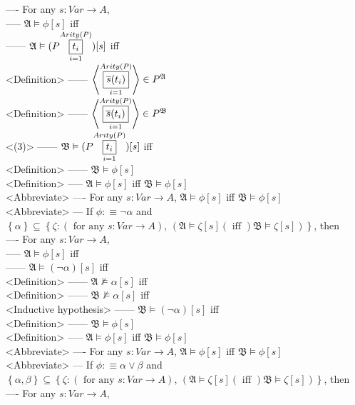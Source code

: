 \documentclass{book}
\newcommand{\is}{:\equiv}
\newcommand{\inot}{\not}
\newcommand{\txtiff}{\left(\text{ iff }\right)}
\newcommand{\txtforall}[2]{\left(\text{ for any }#1\right)\text{, }\left(#2\right)}
\newcommand{\means}[2]{#1^{#2}}
\newcommand{\extend}[1]{\overline{#1}}
\newcommand{\set}[1]{\left\{ #1 \right\}}
\newcommand{\seq}[1]{\left\langle #1 \right\rangle}
\newcommand{\vdc}[3]{\underset{#2}{\overset{#3}{\fbox{$#1$}}}}
\begin{document}
				---- For any $s: Var \rightarrow A$, \\
					----- $\mathfrak{A} \vDash \phi[s]$ iff \\
						------ $\mathfrak{A} \vDash (P \vdc{t_i}{i=1}{Arity(P)})[s]$ iff \\ <Definition>
						------ $\seq{\vdc{\extend{s}(t_i)}{i=1}{Arity(P)}} \in \means{P}{\mathfrak{A}}$ \\ <Definition>
						------ $\seq{\vdc{\extend{s}(t_i)}{i=1}{Arity(P)}} \in \means{P}{\mathfrak{B}}$ \\ <(3)>
						------ $\mathfrak{B} \vDash (P \vdc{t_i}{i=1}{Arity(P)})[s]$ iff \\ <Definition>
						------ $\mathfrak{B} \vDash \phi[s]$ \\ <Definition>
					----- $\mathfrak{A} \vDash \phi[s]$ iff $\mathfrak{B} \vDash \phi[s]$ \\ <Abbreviate>
				---- For any $s: Var \rightarrow A$, $\mathfrak{A} \vDash \phi[s]$ iff $\mathfrak{B} \vDash \phi[s]$ \\ <Abbreviate>
			--- If $\phi \is \lnot \alpha$ and $\set{\alpha} \subseteq \set{\zeta: \txtforall{s: Var \rightarrow A}{\mathfrak{A} \vDash \zeta[s] \txtiff \mathfrak{B} \vDash \zeta[s]}}$, then \\
				---- For any $s: Var \rightarrow A$, \\
					----- $\mathfrak{A} \vDash \phi[s]$ iff \\
						------ $\mathfrak{A} \vDash (\lnot \alpha)[s]$ iff \\ <Definition>
						------ $\mathfrak{A} \inot \vDash \alpha[s]$ iff \\ <Definition>
						------ $\mathfrak{B} \inot \vDash \alpha[s]$ iff \\ <Inductive hypothesis>
						------ $\mathfrak{B} \vDash (\lnot \alpha)[s]$ iff \\ <Definition>
						------ $\mathfrak{B} \vDash \phi[s]$ \\ <Definition>
					----- $\mathfrak{A} \vDash \phi[s]$ iff $\mathfrak{B} \vDash \phi[s]$ \\ <Abbreviate>
				---- For any $s: Var \rightarrow A$, $\mathfrak{A} \vDash \phi[s]$ iff $\mathfrak{B} \vDash \phi[s]$ \\ <Abbreviate>
			--- If $\phi \is \alpha \lor \beta$ and $\set{\alpha, \beta} \subseteq \set{\zeta: \txtforall{s: Var \rightarrow A}{\mathfrak{A} \vDash \zeta[s] \txtiff \mathfrak{B} \vDash \zeta[s]}}$, then \\
				---- For any $s: Var \rightarrow A$, \\
\end{document}

